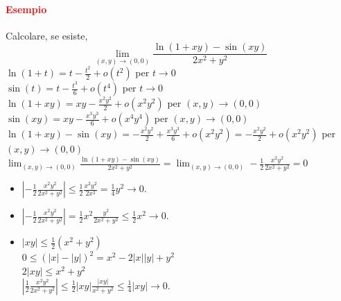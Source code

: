 \documentclass{article}
\begin{document}
\paragraph{\textcolor{red}{Esempio}}
Calcolare, se esiste,
\begin{equation*}
    \lim_{(x,y)\rightarrow (0,0)}\frac{\ln(1+xy)-\sin(xy)}{2x^2+y^2}
\end{equation*}
$\ln(1+t)=t-\frac{t^2}{2}+o(t^2)$ per $t \rightarrow 0$\\
$\sin(t)=t-\frac{t^3}{6}+o(t^4)$ per $t \rightarrow 0$\\
$\ln(1+xy)=xy-\frac{x^2y^2}{2}+o(x^2y^2)$ per $(x,y)\rightarrow (0,0)$\\
$\sin(xy)=xy-\frac{x^3y^3}{6}+o(x^4y^4)$ per $(x,y)\rightarrow (0,0)$\\
$\ln(1+xy)-\sin(xy)=-\frac{x^2y^2}{2}+\frac{x^3y^3}{6}+o(x^2y^2)=-\frac{x^2y^2}{2}+o(x^2y^2)$ per $(x,y)\rightarrow (0,0)$\\
$\lim_{(x,y)\rightarrow(0,0)}\frac{\ln(1+xy)-\sin(xy)}{2x^2+y^2}=\lim_{(x,y)\rightarrow(0,0)} -\frac{1}{2}\frac{x^2y^2}{2x^2+y^2}=0$
\begin{itemize}
    \item $|-\frac{1}{2}\frac{x^2y^2}{2x^2+y^2}|\leq \frac{1}{2}\frac{x^2y^2}{2x^2}=\frac{1}{4}y^2\rightarrow 0$.
    \item $|-\frac{1}{2}\frac{x^2y^2}{2x^2+y^2}|=\frac{1}{2}x^2\frac{y^2}{2x^2+y^2}\leq \frac{1}{2}x^2\rightarrow 0$.
    \item $|xy|\leq \frac{1}{2}(x^2+y^2)$\\
    $0 \leq (|x|-|y|)^2=x^2-2|x||y|+y^2$\\
    $2|xy|\leq x^2+y^2$\\
    $|\frac{1}{2}\frac{x^2y^2}{2x^2+y^2}|\leq \frac{1}{2}|xy|\frac{|xy|}{x^2+y^2}\leq \frac{1}{4}|xy|\rightarrow 0$.
\end{itemize}
\end{document}
